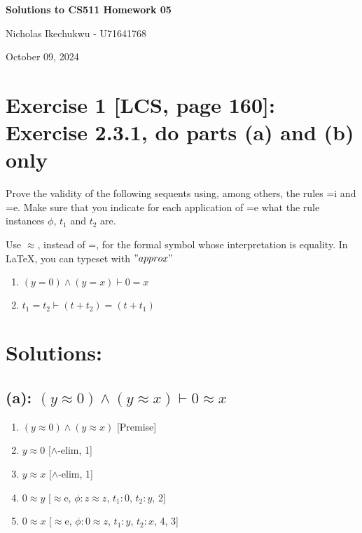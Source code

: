 \documentclass{article}
\newenvironment{proof}
{\begin{mdframed}[linewidth=0.5pt]\begin{enumerate}[label=\arabic*.,leftmargin=*]}
{\end{enumerate}\end{mdframed}}
\begin{document}
\begin{center}
    \Large\textbf{Solutions to CS511 Homework 05}
    
    \vspace{0.5cm}
    
    \large Nicholas Ikechukwu - U71641768
    
    \vspace{0.3cm}
    
    \large October 09, 2024
\end{center}



\section*{Exercise 1 [LCS, page 160]: Exercise 2.3.1, do parts (a) and (b) only }
\begin{mdframed}
    Prove the validity of the following sequents using, among others, the rules =i
    and =e. Make sure that you indicate for each application of =e what the rule
    instances $\phi$, $t_1$ and $t_2$ are.
    
    Use $\approx$, instead of =, for the formal symbol whose interpretation is equality. In LaTeX, you can typeset
    with ${"approx"}$
     
    
    \begin{enumerate}[label=(\alph*)]
    \item $(y = 0) \land (y = x) \vdash 0 = x$
    \item $t_1 = t_2 \vdash (t + t_2) = (t + t_1)$
    \end{enumerate}
\end{mdframed}

\section*{Solutions:}

\subsection*{(a): $(y \approx 0) \land (y \approx x) \vdash 0 \approx x$}

\begin{proof}
\item $(y \approx 0) \land (y \approx x)$ \hfill [Premise]
\item $y \approx 0$ \hfill [$\land$-elim, 1]
\item $y \approx x$ \hfill [$\land$-elim, 1]
\item $0 \approx y$ \hfill [$\approx$e, $\phi: z \approx z$, $t_1: 0$, $t_2: y$, 2]
\item $0 \approx x$ \hfill [$\approx$e, $\phi: 0 \approx z$, $t_1: y$, $t_2: x$, 4, 3]
\end{proof}
\end{document}
